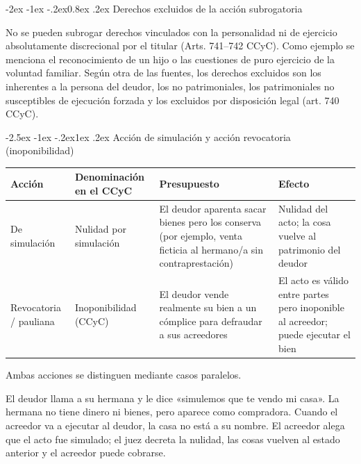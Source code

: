 \documentclass[12pt,oneside]{book}
\makeatletter
\renewcommand\subsection{\@startsection{subsection}{2}{\z@}%
  {-2.5ex \@plus -1ex \@minus -.2ex}{1ex \@plus .2ex}%
  {\normalfont\normalsize\bfseries}}
\renewcommand\subsubsection{\@startsection{subsubsection}{3}{\z@}%
  {-2ex \@plus -1ex \@minus -.2ex}{0.8ex \@plus .2ex}%
  {\normalfont\normalsize\bfseries\itshape}}
\newenvironment{tabla}{%
    \par\medskip\begingroup\small\renewcommand{\arraystretch}{1.3}\noindent\ignorespaces
}{%
    \par\endgroup\medskip
}
\makeatother
\begin{document}
\subsubsection{Derechos excluidos de la acción subrogatoria}

No se pueden subrogar derechos vinculados con la personalidad ni de ejercicio absolutamente discrecional por el titular (Arts. 741--742 CCyC). Como ejemplo se menciona el reconocimiento de un hijo o las cuestiones de puro ejercicio de la voluntad familiar. Según otra de las fuentes, los derechos excluidos son los inherentes a la persona del deudor, los no patrimoniales, los patrimoniales no susceptibles de ejecución forzada y los excluidos por disposición legal (art. 740 CCyC).


\subsection{Acción de simulación y acción revocatoria (inoponibilidad)}

\begin{tabla}
\begin{tabularx}{\textwidth}{B{2.6cm}P{3.2cm}YY}
\toprule
Acción & \textbf{Denominación en el CCyC} & \textbf{Presupuesto} & \textbf{Efecto} \\
\midrule
De simulación & Nulidad por simulación & El deudor aparenta sacar bienes pero los conserva (por ejemplo, venta ficticia al hermano/a sin contraprestación) & Nulidad del acto; la cosa vuelve al patrimonio del deudor \\
Revocatoria / pauliana & Inoponibilidad (CCyC) & El deudor vende realmente su bien a un cómplice para defraudar a sus acreedores & El acto es válido entre partes pero inoponible al acreedor; puede ejecutar el bien \\
\bottomrule
\end{tabularx}
\end{tabla}

Ambas acciones se distinguen mediante casos paralelos.

\begin{ejemplo}[{Simulación}]
El deudor llama a su hermana y le dice «simulemos que te vendo mi casa». La hermana no tiene dinero ni bienes, pero aparece como compradora. Cuando el acreedor va a ejecutar al deudor, la casa no está a su nombre. El acreedor alega que el acto fue simulado; el juez decreta la nulidad, las cosas vuelven al estado anterior y el acreedor puede cobrarse.
\end{ejemplo}
\end{document}
